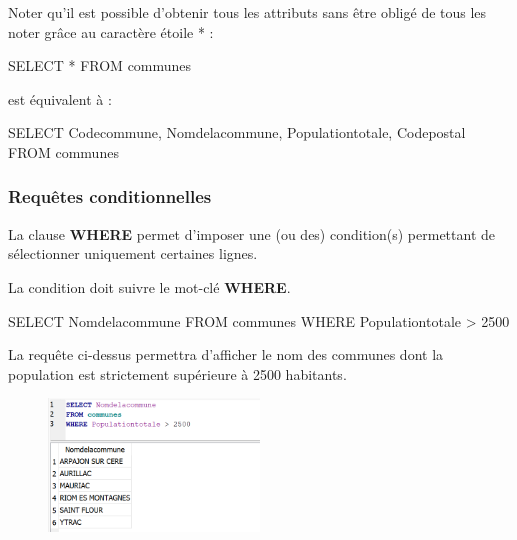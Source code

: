 \documentclass[
  letterpaper,
  DIV=11,
  numbers=noendperiod]{scrartcl}
\newenvironment{Shaded}{\begin{snugshade}}{\end{snugshade}}
\newcommand{\DecValTok}[1]{\textcolor[rgb]{0.68,0.00,0.00}{#1}}
\newcommand{\KeywordTok}[1]{\textcolor[rgb]{0.00,0.23,0.31}{#1}}
\newcommand{\NormalTok}[1]{\textcolor[rgb]{0.00,0.23,0.31}{#1}}
\newcommand{\OperatorTok}[1]{\textcolor[rgb]{0.37,0.37,0.37}{#1}}
\begin{document}
Noter qu'il est possible d'obtenir tous les attributs sans être obligé
de tous les noter grâce au caractère étoile * :

\begin{Shaded}
\begin{Highlighting}[]
\KeywordTok{SELECT} \OperatorTok{*}
\KeywordTok{FROM}\NormalTok{ communes}
\end{Highlighting}
\end{Shaded}

est équivalent à :

\begin{Shaded}
\begin{Highlighting}[]
\KeywordTok{SELECT}\NormalTok{  Codecommune, Nomdelacommune, Populationtotale, Codepostal}
\KeywordTok{FROM}\NormalTok{ communes}
\end{Highlighting}
\end{Shaded}

\hypertarget{requuxeates-conditionnelles}{%
\subsubsection{Requêtes
conditionnelles}\label{requuxeates-conditionnelles}}

La clause \textbf{WHERE} permet d'imposer une (ou des) condition(s)
permettant de sélectionner uniquement certaines lignes.

La condition doit suivre le mot-clé \textbf{WHERE}.

\begin{Shaded}
\begin{Highlighting}[]
\KeywordTok{SELECT}\NormalTok{ Nomdelacommune}
\KeywordTok{FROM}\NormalTok{ communes}
\KeywordTok{WHERE}\NormalTok{ Populationtotale }\OperatorTok{\textgreater{}} \DecValTok{2500}
\end{Highlighting}
\end{Shaded}

La requête ci-dessus permettra d'afficher le nom des communes dont la
population est strictement supérieure à 2500 habitants.

\begin{figure}

{\centering \includegraphics[width=0.5\textwidth,height=\textheight]{SQL2.png}

}

\end{figure}
\end{document}
